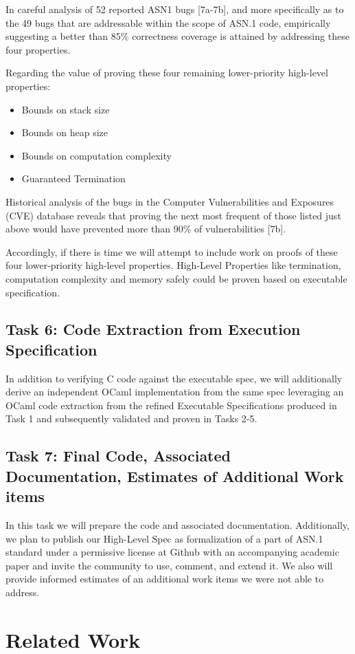 \documentclass[acmsmall,nonacm]{acmart}
\begin{document}
In careful analysis of 52 reported ASN1 bugs [7a-7b], and more specifically as to the 49 bugs that are addressable within the scope of ASN.1 code, empirically suggesting a better than 85\% correctness coverage is attained by addressing  these four properties.

Regarding the value of proving these four remaining lower-priority high-level properties:
\begin{itemize}
\item Bounds on stack size
\item Bounds on heap size
\item Bounds on computation complexity
\item Guaranteed Termination
\end{itemize}
Historical analysis of the bugs in the Computer Vulnerabilities and Exposures (CVE) database reveals that proving the next most frequent of those listed just above would have prevented more than 90\% of vulnerabilities [7b]. 

Accordingly, if there is time we will attempt to include work on proofs of these four lower-priority high-level properties. High-Level Properties like termination, computation complexity and memory safely could be proven based on executable specification. 

\subsection{Task 6: Code Extraction from Execution Specification}
In addition to verifying C code against the executable spec, we will additionally derive an independent OCaml implementation from the same spec leveraging an OCaml code extraction from the refined Executable Specifications produced in Task 1 and subsequently validated and proven in Tasks 2-5. 

\subsection{Task 7: Final Code, Associated Documentation, Estimates of Additional Work items}
In this task we will prepare the code and associated documentation. Additionally, we plan to publish our High-Level Spec as formalization of a part of ASN.1 standard under a permissive license at Github with an accompanying academic paper and invite the community to use, comment, and extend it. 
We also will provide informed estimates of an additional work items we were not able to address. 

\section{Related Work}
\end{document}

